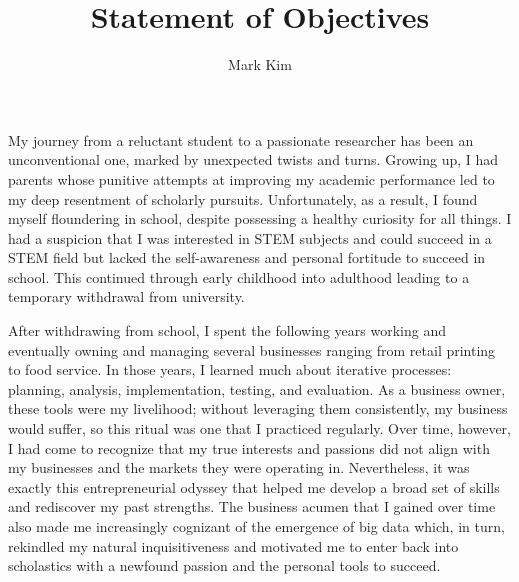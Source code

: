 \documentclass[12pt]{article}
\author{Mark Kim}
\title{Statement of Objectives}
\begin{document}
\maketitle

My journey from a reluctant student to a passionate researcher has been an unconventional one, marked by unexpected twists and turns. Growing
up, I had parents whose punitive attempts at improving my academic performance led to my deep resentment of scholarly pursuits.
Unfortunately, as a result, I found myself floundering in school, despite possessing a healthy curiosity for all things.
I had a suspicion that I was interested in STEM subjects and could succeed in a STEM field but lacked the self-awareness and personal
fortitude to succeed in school.  This continued through early childhood into adulthood leading to a temporary withdrawal from university.

After withdrawing from school, I spent the following years working and eventually owning and managing several businesses ranging from
retail printing to food service.  In those years, I learned much about iterative processes: planning, analysis, implementation, testing, and
evaluation.  As a business owner, these tools were my livelihood; without leveraging them consistently, my business would suffer, so this
ritual was one that I practiced regularly. Over time, however, I had come to recognize that my true interests and passions did not align
with my businesses and the markets they were operating in. Nevertheless, it was exactly this entrepreneurial odyssey that helped me develop
a broad set of skills and rediscover my past strengths.  The business acumen that I gained over time also made me increasingly cognizant of
the emergence of big data which, in turn, rekindled my natural inquisitiveness and motivated me to enter back into scholastics with a
newfound passion and the personal tools to succeed.
\end{document}
